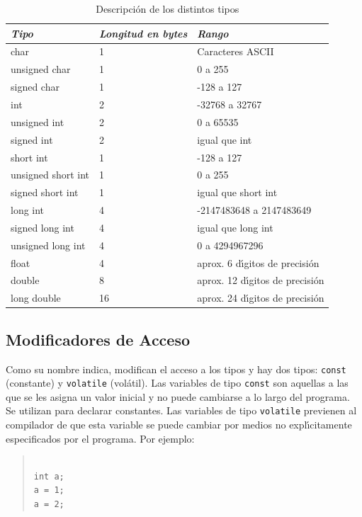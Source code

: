 \begin{table}[!hbp]
\begin{tabular}{|l|p{0.5in}|p{1in}|} \hline
\em Tipo & \em Longitud en bytes & \em Rango\\\hline
\hline
char & 1 & Caracteres ASCII\\\hline
unsigned char & 1 & 0 a 255\\\hline
signed char & 1 & -128 a 127\\\hline
int & 2 & -32768 a 32767\\\hline
unsigned int & 2 & 0 a 65535\\\hline
signed int & 2 & igual que int\\\hline
short int & 1 & -128 a 127\\\hline
unsigned short int & 1 & 0 a 255\\\hline
signed short int & 1 & igual que short int\\\hline
long int & 4 & -2147483648 a 2147483649\\\hline
signed long int & 4 & igual que long int\\\hline
unsigned long int & 4 & 0 a 4294967296\\\hline
float & 4 & aprox. 6 d\'{\i}gitos de precisi\'on\\\hline
double & 8 & aprox. 12 d\'{\i}gitos de precisi\'on\\\hline
long double & 16 & aprox. 24 d\'{\i}gitos de precisi\'on\\\hline
\end{tabular}
\caption{Descripci\'on de los distintos tipos}
\end{table}

\subsection{Modificadores de Acceso}


Como su nombre indica, modifican el acceso a los tipos y hay dos tipos: 
\texttt{const} (constante) y \texttt{volatile} (vol\'atil). Las variables de
tipo \texttt{const} son aquellas a las que se les asigna un valor inicial y no
puede cambiarse a lo largo del programa. Se utilizan para declarar constantes.
Las variables de tipo \texttt{volatile} previenen al compilador de que esta
 variable se puede cambiar por medios no expl\'{\i}citamente especificados
por el programa. Por ejemplo:

\begin{quotation}
\begin{verbatim}

int a;
a = 1;
a = 2;

\end{verbatim}
\end{quotation}

